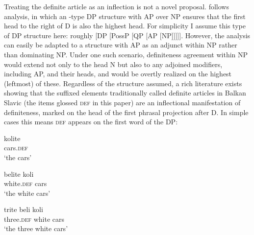 \documentclass[output=paper,
colorlinks,
citecolor=brown,
newtxmath
]{langscibook}
\begin{document}
Treating the definite article as an inflection is not a novel proposal.  follows  analysis, in which an \citeauthor{Abney1987}-type DP structure with AP over NP ensures that the first head to the right of D is also the highest head. For simplicity I assume this type of DP structure here: roughly [DP [PossP [QP [AP [NP]]]]]. However, the analysis can easily be adapted to a structure with AP as an adjunct within NP rather than dominating NP. Under one such scenario, definiteness agreement within NP would extend not only to the head N but also to any adjoined modifiers, including AP, and their heads, and would be overtly realized on the highest (leftmost) of these. Regardless of the structure assumed, a rich literature exists showing that the suffixed elements traditionally called definite articles in Balkan Slavic (the items glossed \textsc{def} in this paper) are an inflectional manifestation of definiteness, marked on the head of the first phrasal projection after D. In simple cases this means \textsc{def} appears on the first word of the DP:





\ea \label{articles}
\ea
\gll kolite \\
cars.\textsc{def}\\
\glt `the cars'

\ex
\gll belite koli\\
white.\textsc{def} cars\\
\glt `the white cars'

\ex
\gll trite beli koli\\
three.\textsc{def} white cars\\
\glt `the three white cars'
\end{document}
